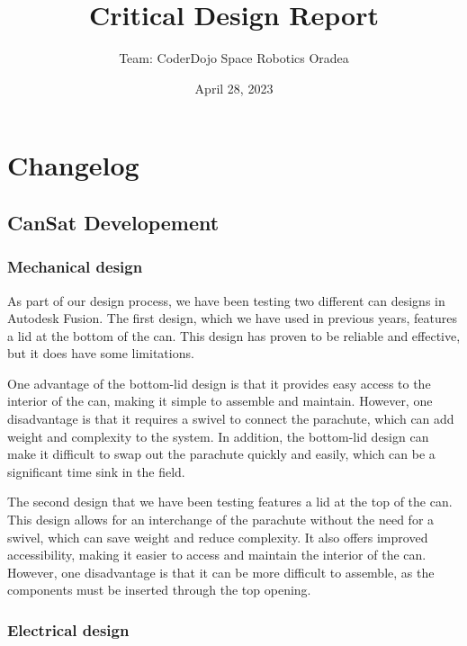 \documentclass[11pt]{article}
\title{Critical Design Report}
\author{Team: CoderDojo Space Robotics Oradea}
\date{April 28, 2023}
\begin{document}


\newpage

\tableofcontents
\pagestyle{plain}

\newpage

\section*{Changelog}

\subsection*{CanSat Developement}

\subsubsection*{Mechanical design}

As part of our design process, we have been testing two different can designs in Autodesk Fusion. The first design, which we have used in previous years, features a lid at the bottom of the can. This design has proven to be reliable and effective, but it does have some limitations.

One advantage of the bottom-lid design is that it provides easy access to the interior of the can, making it simple to assemble and maintain. However, one disadvantage is that it requires a swivel to connect the parachute, which can add weight and complexity to the system. In addition, the bottom-lid design can make it difficult to swap out the parachute quickly and easily, which can be a significant time sink in the field.

The second design that we have been testing features a lid at the top of the can. This design allows for an interchange of the parachute without the need for a swivel, which can save weight and reduce complexity. It also offers improved accessibility, making it easier to access and maintain the interior of the can. However, one disadvantage is that it can be more difficult to assemble, as the components must be inserted through the top opening.

\subsubsection*{Electrical design}
\end{document}
